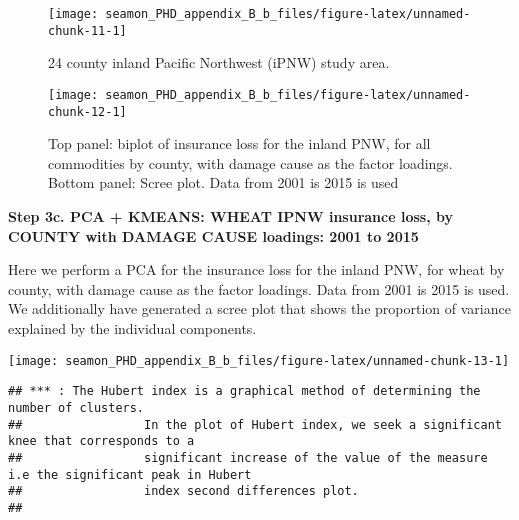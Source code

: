 \documentclass[]{article}
\begin{document}
\newpage

\begin{figure}

{\centering \texttt{[image: seamon\_PHD\_appendix\_B\_b\_files/figure-latex/unnamed-chunk-11-1]} 

}

\caption{24 county inland Pacific Northwest (iPNW) study area. }\label{fig:unnamed-chunk-11}
\end{figure}
\newpage

\begin{figure}

{\centering \texttt{[image: seamon\_PHD\_appendix\_B\_b\_files/figure-latex/unnamed-chunk-12-1]} 

}

\caption{Top panel: biplot of insurance loss for the inland PNW, for all commodities by county, with damage cause as the factor loadings.  Bottom panel: Scree plot. Data from 2001 is 2015 is used}\label{fig:unnamed-chunk-12}
\end{figure}

\newpage

\textbf{Step 3c. PCA + KMEANS: WHEAT IPNW insurance loss, by COUNTY with
DAMAGE CAUSE loadings: 2001 to 2015}

Here we perform a PCA for the insurance loss for the inland PNW, for
wheat by county, with damage cause as the factor loadings. Data from
2001 is 2015 is used. We additionally have generated a scree plot that
shows the proportion of variance explained by the individual components.

\begin{center}\texttt{[image: seamon\_PHD\_appendix\_B\_b\_files/figure-latex/unnamed-chunk-13-1]} \end{center}
\newpage

\begin{verbatim}
## *** : The Hubert index is a graphical method of determining the number of clusters.
##                 In the plot of Hubert index, we seek a significant knee that corresponds to a 
##                 significant increase of the value of the measure i.e the significant peak in Hubert
##                 index second differences plot. 
## 
\end{verbatim}
\end{document}
